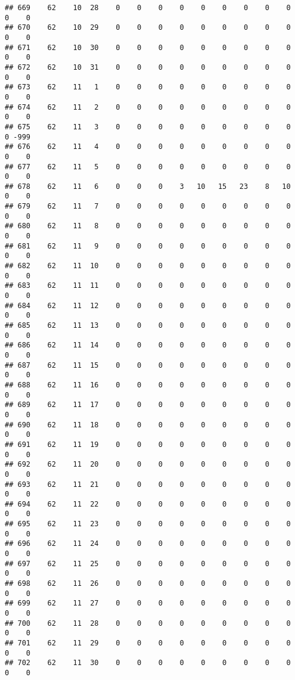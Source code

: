 \documentclass[]{article}
\begin{document}
\begin{verbatim}
## 669    62    10  28    0    0    0    0    0    0    0    0    0    0    0
## 670    62    10  29    0    0    0    0    0    0    0    0    0    0    0
## 671    62    10  30    0    0    0    0    0    0    0    0    0    0    0
## 672    62    10  31    0    0    0    0    0    0    0    0    0    0    0
## 673    62    11   1    0    0    0    0    0    0    0    0    0    0    0
## 674    62    11   2    0    0    0    0    0    0    0    0    0    0    0
## 675    62    11   3    0    0    0    0    0    0    0    0    0    0 -999
## 676    62    11   4    0    0    0    0    0    0    0    0    0    0    0
## 677    62    11   5    0    0    0    0    0    0    0    0    0    0    0
## 678    62    11   6    0    0    0    3   10   15   23    8   10    0    0
## 679    62    11   7    0    0    0    0    0    0    0    0    0    0    0
## 680    62    11   8    0    0    0    0    0    0    0    0    0    0    0
## 681    62    11   9    0    0    0    0    0    0    0    0    0    0    0
## 682    62    11  10    0    0    0    0    0    0    0    0    0    0    0
## 683    62    11  11    0    0    0    0    0    0    0    0    0    0    0
## 684    62    11  12    0    0    0    0    0    0    0    0    0    0    0
## 685    62    11  13    0    0    0    0    0    0    0    0    0    0    0
## 686    62    11  14    0    0    0    0    0    0    0    0    0    0    0
## 687    62    11  15    0    0    0    0    0    0    0    0    0    0    0
## 688    62    11  16    0    0    0    0    0    0    0    0    0    0    0
## 689    62    11  17    0    0    0    0    0    0    0    0    0    0    0
## 690    62    11  18    0    0    0    0    0    0    0    0    0    0    0
## 691    62    11  19    0    0    0    0    0    0    0    0    0    0    0
## 692    62    11  20    0    0    0    0    0    0    0    0    0    0    0
## 693    62    11  21    0    0    0    0    0    0    0    0    0    0    0
## 694    62    11  22    0    0    0    0    0    0    0    0    0    0    0
## 695    62    11  23    0    0    0    0    0    0    0    0    0    0    0
## 696    62    11  24    0    0    0    0    0    0    0    0    0    0    0
## 697    62    11  25    0    0    0    0    0    0    0    0    0    0    0
## 698    62    11  26    0    0    0    0    0    0    0    0    0    0    0
## 699    62    11  27    0    0    0    0    0    0    0    0    0    0    0
## 700    62    11  28    0    0    0    0    0    0    0    0    0    0    0
## 701    62    11  29    0    0    0    0    0    0    0    0    0    0    0
## 702    62    11  30    0    0    0    0    0    0    0    0    0    0    0

\end{verbatim}
\end{document}
